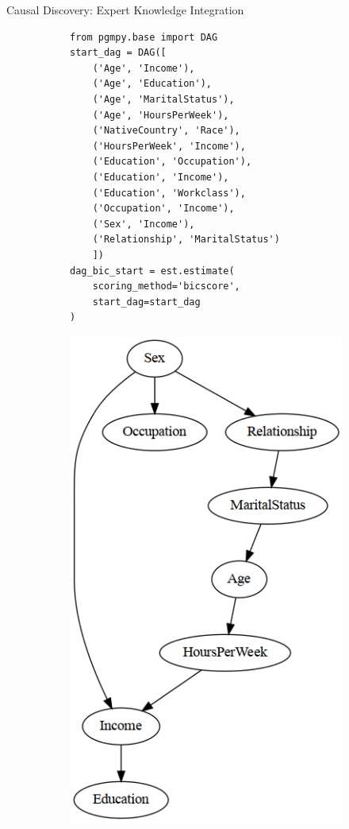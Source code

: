 \documentclass[aspectratio=169]{beamer}
\begin{document}
\begin{frame}[fragile]{Causal Discovery: Expert Knowledge Integration}
	\begin{figure}
		\begin{subfigure}{0.5 \textwidth}
			\begin{verbatim}
from pgmpy.base import DAG
start_dag = DAG([
    ('Age', 'Income'),
    ('Age', 'Education'),
    ('Age', 'MaritalStatus'),
    ('Age', 'HoursPerWeek'),
    ('NativeCountry', 'Race'),
    ('HoursPerWeek', 'Income'),
    ('Education', 'Occupation'),
    ('Education', 'Income'),
    ('Education', 'Workclass'),
    ('Occupation', 'Income'),
    ('Sex', 'Income'),
    ('Relationship', 'MaritalStatus')
    ])
dag_bic_start = est.estimate(
    scoring_method='bicscore',
    start_dag=start_dag
)
			\end{verbatim}
		\end{subfigure}%
		\begin{subfigure}{0.5 \textwidth}
			\centering
			\includegraphics[scale=0.3]{imgs/adult_bic_start.png}
		\end{subfigure}
	\end{figure}
\end{frame}
\end{document}
